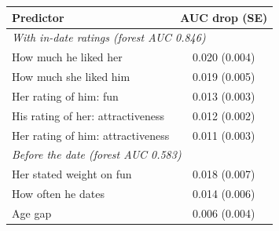 \begin{tabular}{lc}
\toprule
Predictor & AUC drop (SE) \\
\midrule
\multicolumn{2}{l}{\textit{With in-date ratings (forest AUC 0.846)}} \\
How much he liked her & 0.020 (0.004) \\
How much she liked him & 0.019 (0.005) \\
Her rating of him: fun & 0.013 (0.003) \\
His rating of her: attractiveness & 0.012 (0.002) \\
Her rating of him: attractiveness & 0.011 (0.003) \\
\midrule
\multicolumn{2}{l}{\textit{Before the date (forest AUC 0.583)}} \\
Her stated weight on fun & 0.018 (0.007) \\
How often he dates & 0.014 (0.006) \\
Age gap & 0.006 (0.004) \\
\bottomrule
\end{tabular}
